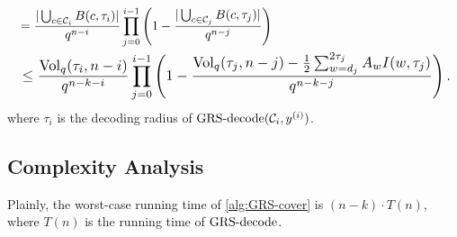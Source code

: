 \documentclass[conference]{IEEEtran}
\begin{document}
{\begin{align*}
    &= \frac{|\bigcup_{c \in \CC_{i}} B(c, \tau_{i})|}{q^{n - i}}
    \prod_{j = 0}^{i - 1} 
    \left(1 - \frac{|\bigcup_{c \in \CC_{j}} B(c, \tau_{j})|}{q^{n - j}}\right) \\ 
    &
    \resizebox{\hsize}{!}{
    $\displaystyle \le  %
    \frac{\Vol_{q}(\tau_{i}, n - i)}{q^{n - k - i}} 
    \prod_{j = 0}^{i - 1} 
    \left(1 - \frac{ %
    \Vol_{q}(\tau_{j}, n - j) 
    - \frac{1}{2} \sum_{w = d_{j}}^{2 \tau_{j}} A_{w} I(w, \tau_{j})}{q^{n - k - j}}\right).$}%
\end{align*}
where $\tau_{i}$ is the decoding radius of $\operatorname{GRS-decode}({\mathcal C}_{i}, y^{(i)})$. 
} 


\subsection{Complexity Analysis}

Plainly, the worst-case running time of \autoref{alg:GRS-cover} is $(n - k) \cdot T(n)$, where $T(n)$ is the running time of $\operatorname{GRS-decode}$. 
\end{document}
